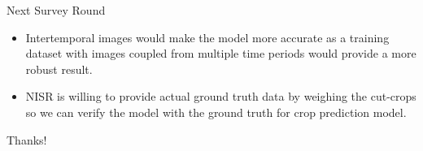 \documentclass{beamer}
\begin{document}
\begin{frame}{Next Survey Round}
\begin{itemize} 
	\item Intertemporal images would make the model more accurate as a training dataset with images coupled from multiple time periods would provide a more robust result. %
	
	\item NISR is willing to provide actual ground truth data by weighing the cut-crops so we can verify the model with the ground truth for crop prediction model. %
\end{itemize}
\end{frame}
\begin{frame}
	\begin{center}
		Thanks!
	\end{center}
\end{frame}
\end{document}
